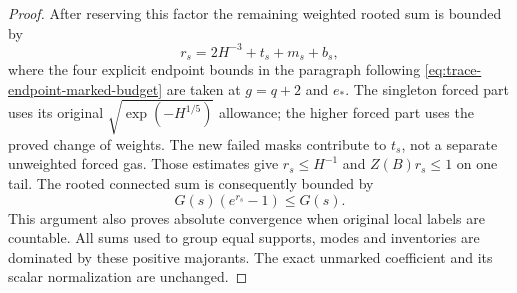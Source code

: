 \begin{proof}
After reserving this factor the remaining weighted rooted sum is
bounded by
\[
 r_s=2H^{-3}+t_s+m_s+b_s,
\]
where the four explicit endpoint bounds in the paragraph following
\eqref{eq:trace-endpoint-marked-budget} are taken at $g=q+2$ and
$e_*$. The singleton forced part uses its original
$\sqrt{\exp(-H^{1/5})}$ allowance; the higher forced part uses the
proved change of weights. The new failed masks contribute to $t_s$,
not a separate unweighted forced gas. Those estimates give
$r_s\le H^{-1}$ and $Z(B)r_s\le1$ on one tail. The rooted connected
sum is consequently bounded by
\[
             G(s)(e^{r_s}-1)\le G(s).
\]
This argument also proves absolute convergence when original local
labels are countable. All sums used to group equal supports, modes
and inventories are dominated by these positive majorants. The exact
unmarked coefficient and its scalar normalization are unchanged.
\end{proof}

